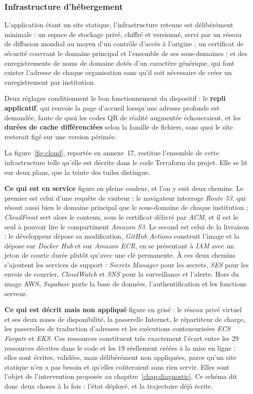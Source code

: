 \subsubsection{Infrastructure d'hébergement}

L'application étant un site statique, l'infrastructure retenue est délibérément
minimale : un espace de stockage privé, chiffré et versionné, servi par un
réseau de diffusion mondial au moyen d'un contrôle d'accès à l'origine ; un
certificat de sécurité couvrant le domaine principal et l'ensemble de ses
sous-domaines ; et des enregistrements de noms de domaine dotés d'un caractère
générique, qui font exister l'adresse de chaque organisation sans qu'il soit
nécessaire de créer un enregistrement par institution.

Deux réglages conditionnent le bon fonctionnement du dispositif : le
\textbf{repli applicatif}, qui renvoie la page d'accueil lorsqu'une adresse
profonde est demandée, faute de quoi les codes QR de réalité augmentée
échoueraient, et les \textbf{durées de cache différenciées} selon la famille de
fichiers, sans quoi le site resterait figé sur une version périmée.

La figure~\ref{fig:cloud}, reportée en annexe~17, restitue l'ensemble de cette
infrastructure telle
qu'elle est décrite dans le code Terraform du projet. Elle se lit sur deux
plans, que la teinte des tuiles distingue.

\textbf{Ce qui est en service} figure en pleine couleur, et l'on y suit deux
chemins. Le premier est celui d'une requête de visiteur : le navigateur
interroge \emph{Route 53}, qui résout aussi bien le domaine principal que le
sous-domaine de chaque institution ; \emph{CloudFront} sert alors le contenu,
sous le certificat délivré par \emph{ACM}, et il est le seul à pouvoir lire le
compartiment \emph{Amazon S3}. Le second est celui de la livraison : le
développeur dépose sa modification, \emph{GitHub Actions} construit l'image et
la dépose sur \emph{Docker Hub} et sur \emph{Amazon ECR}, en se présentant à
\emph{IAM} avec un jeton de courte durée plutôt qu'avec une clé permanente. À
ces deux chemins s'ajoutent les services de support : \emph{Secrets Manager}
pour les secrets, \emph{SES} pour les envois de courrier, \emph{CloudWatch} et
\emph{SNS} pour la surveillance et l'alerte. Hors du nuage AWS, \emph{Supabase}
porte la base de données, l'authentification et les fonctions serveur.

\textbf{Ce qui est décrit mais non appliqué} figure en grisé : le réseau privé
virtuel et ses deux zones de disponibilité, la passerelle Internet, le
répartiteur de charge, les passerelles de traduction d'adresses et les
exécutions conteneurisées \emph{ECS Fargate} et \emph{EKS}. Ces ressources
constituent très exactement l'écart entre les 29 ressources décrites dans le
code et les 19 réellement créées à la mise en ligne : elles sont écrites,
validées, mais délibérément non appliquées, parce qu'un site statique n'en a pas
besoin et qu'elles coûteraient sans rien servir. Elles sont l'objet de
l'intervention proposée au chapitre~\ref{chap:diagnostic}. Ce schéma dit donc
deux choses à la fois : l'état déployé, et la trajectoire déjà écrite.


